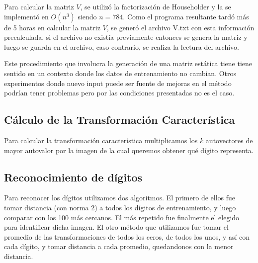 Para calcular la matriz $V$, se utiliz\'o la factorizaci\'on de Householder y la se implement\'o en $O(n^3)$ 
siendo $n = 784$. Como el programa resultante tard\'o m\'as de 5 horas en calcular la matriz $V$, se gener\'o 
el archivo V.txt con esta informaci\'on precalculada, si el archivo no exist\'ia previamente entonces se 
genera la matriz y luego se guarda en el archivo, caso contrario, se realiza la lectura del archivo.

Este procedimiento que involucra la generaci\'on de una matriz est\'atica tiene tiene sentido en un contexto
donde los datos de entrenamiento no cambian. Otros experimentos donde nuevo input puede ser fuente de mejoras
en el m\'etodo podr\'ian tener problemas pero por las condiciones presentadas no es el caso.

\subsection{C\'alculo de la Transformaci\'on Caracter\'istica}
Para calcular la transformaci\'on caracter\'istica multiplicamos los $k$ autovectores de mayor autovalor por
la imagen de la cual queremos obtener qu\'e d\'igito representa.



\subsection{Reconocimiento de d\'igitos}
Para reconocer los d\'igitos utilizamos dos algoritmos. El primero de ellos fue tomar distancia (con norma 2) a
todos los d\'igitos de entrenamiento, y luego comparar con los 100 m\'as cercanos. El m\'as repetido fue finalmente
el elegido para identificar dicha imagen. El otro m\'etodo que utilizamos fue tomar el promedio de las transformaciones
de todos los ceros, de todos los unos, y as\'i con cada d\'igito, y tomar distancia a cada promedio, quedandonos con la
menor distancia.
